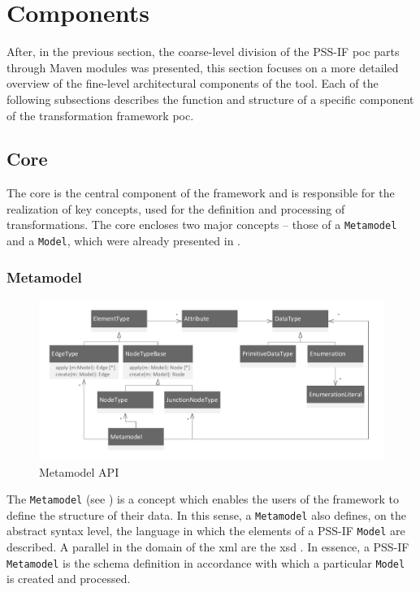 \section{Components}
\label{sec:impl:components}

After, in the previous section, the coarse-level division of the PSS-IF \gls{poc} parts through Maven modules was presented, this section focuses on a more detailed overview of the fine-level architectural components of the tool. Each of the following subsections describes the function and structure of a specific component of the transformation framework \gls{poc}.

\subsection{Core}

The core is the central component of the framework and is responsible for the realization of key concepts, used for the definition and processing of transformations. The core encloses two major concepts -- those of a \texttt{Metamodel} and a \texttt{Model}, which were already presented in .

\subsubsection{Metamodel}

\begin{figure}
\centering
\includegraphics[width=\textwidth]{figures/metamodel.pdf}
\caption{Metamodel API}
\label{fig:metamodel}
\end{figure}

The \texttt{Metamodel} (see ) is a concept which enables the users of the framework to define the structure of their data. In this sense, a \texttt{Metamodel} also defines, on the abstract syntax level, the language in which the elements of a PSS-IF \texttt{Model} are described. A parallel in the domain of the \gls{xml} are the \gls{xsd} \cite{ref:xsd}. In essence, a PSS-IF \texttt{Metamodel} is the schema definition in accordance with which a particular \texttt{Model} is created and processed.

